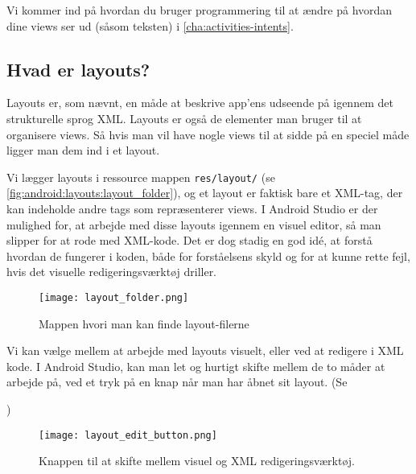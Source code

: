 Vi kommer ind på hvordan du bruger programmering til at ændre på hvordan dine views ser ud (såsom teksten) i \autoref{cha:activities-intents}.

\subsection{Hvad er layouts?}
Layouts er, som nævnt, en måde at beskrive app'ens udseende på igennem det strukturelle sprog XML. Layouts er også de elementer man bruger til at organisere views. Så hvis man vil have nogle views til at sidde på en speciel måde ligger man dem ind i et layout.

Vi lægger layouts i ressource mappen \texttt{res/layout/} (se \autoref{fig:android:layouts:layout_folder}), og et layout er 
faktisk bare et XML-tag, der kan indeholde andre tags som repræsenterer views.
I Android Studio er der mulighed for, at arbejde med disse layouts igennem en 
visuel editor, så man slipper for at rode med XML-kode. Det er dog stadig en 
god idé, at forstå hvordan de fungerer i koden, både for forståelsens skyld og 
for at kunne rette fejl, hvis det visuelle redigeringsværktøj driller.

\begin{figure}[h]
	\begin{center}
		\texttt{[image: layout\_folder.png]}
		\caption{Mappen hvori man kan finde layout-filerne}
		\label{fig:android:layouts:layout_folder}
	\end{center}
\end{figure}

Vi kan vælge mellem at arbejde med layouts visuelt, eller ved at redigere i XML kode. I Android Studio, kan man let og hurtigt skifte mellem de to måder at arbejde på, ved et tryk på en knap når man har åbnet sit layout. (Se \author{fig:android:layouts:layout_edit_button})

\begin{figure}[h]
	\begin{center}
		\texttt{[image: layout\_edit\_button.png]}
		\caption{Knappen til at skifte mellem visuel og XML redigeringsværktøj.}
		\label{fig:android:layouts:layout_edit_button}
	\end{center}
\end{figure}


